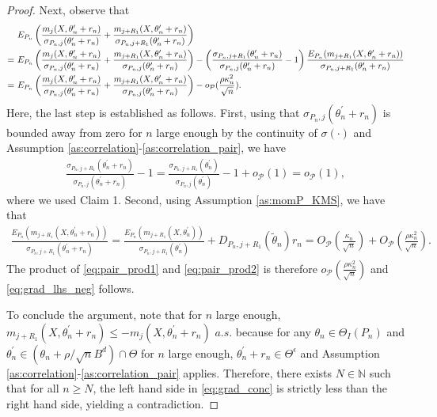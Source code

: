\documentclass[letterpaper,11pt]{article}
\theoremstyle{myplain}
\theoremstyle{mydefinition}
\theoremstyle{myremark}
\newcommand{\N}{\mathbb{N}}
\newcommand{\cP}{\mathcal{P}}
\newcommand{\thetnprime}{(\theta_n +\rho /\sqrt{n} B^d)\cap \Theta}
\numberwithin{equation}{section}
\numberwithin{figure}{section}
\begin{document}
\begin{appendices}
\begin{proof}
Next, observe that
\begin{align}
&~E_{P_n}\left( \frac{m_j(X,\theta^\prime_n+r_n)}{\sigma_{P_n,j}(\theta^\prime_n+r_n)} + \frac{m_{j+R_1}(X,\theta^\prime_n+r_n)}{\sigma_{P_n,j+R_1}(\theta^\prime_n+r_n)}\right) \notag\\
= &~E_{P_n}\left( \frac{m_j(X,\theta^\prime_n+r_n)}{\sigma_{P_n,j}(\theta^\prime_n+r_n)} + \frac{m_{j+R_1}(X,\theta^\prime_n+r_n)}{\sigma_{P_n,j}(\theta^\prime_n+r_n)}\right) - \left(\frac{\sigma_{P_n,j+R_1}(\theta^\prime_n+r_n)}{\sigma_{P_n,j}(\theta^\prime_n+r_n)}-1 \right) \frac{E_{P_n}(m_{j+R_1}(X,\theta^\prime_n+r_n))}{\sigma_{P_n,j+R_1}(\theta^\prime_n+r_n)}\notag\\
= &~E_{P_n}\left( \frac{m_j(X,\theta^\prime_n+r_n)}{\sigma_{P_n,j}(\theta^\prime_n+r_n)} + \frac{m_{j+R_1}(X,\theta^\prime_n+r_n)}{\sigma_{P_n,j}(\theta^\prime_n+r_n)}\right) - o_\cP(\frac{\rho \kappa_n^2}{\sqrt n}).\label{eq:grad_lhs_neg}
\end{align}
Here, the last step is established as follows.
First, using that $\sigma_{P_n,j}(\theta^\prime_n+r_n)$ is bounded away from zero for $n$ large enough by the continuity of $\sigma(\cdot)$ and Assumption \ref{as:correlation}-\ref{as:correlation_pair}, we have
\begin{align}
\frac{\sigma_{P_n,j+R_1}(\theta^\prime_n+r_n)}{\sigma_{P_n,j}(\theta^\prime_n+r_n)}-1=\frac{\sigma_{P_n,j+R_1}(\theta^\prime_n)}{\sigma_{P_n,j}(\theta^\prime_n)}-1 +o_\cP(1)=o_\cP(1),\label{eq:pair_prod1}
\end{align}
where we used Claim 1.
Second, using Assumption \ref{as:momP_KMS}, we have that
\begin{align}
\frac{E_{P_n}(m_{j+R_1}(X,\theta^\prime_n+r_n))}{\sigma_{P_n,j+R_1}(\theta^\prime_n+r_n)} = \frac{E_{P_n}(m_{j+R_1}(X,\theta^\prime_n))}{\sigma_{P_n,j+R_1}(\theta^\prime_n)}+D_{P_n,j+R_1}(\tilde{\theta}_n) r_n = O_\cP(\frac{\kappa_n}{\sqrt n})+O_\cP(\frac{\rho \kappa_n^2}{\sqrt n}).\label{eq:pair_prod2}
\end{align}
The product of \eqref{eq:pair_prod1} and \eqref{eq:pair_prod2} is therefore $o_\cP(\frac{\rho \kappa_n^2}{\sqrt n})$ and \eqref{eq:grad_lhs_neg} follows.

To conclude the argument, note that for $n$ large enough, $m_{j+R_1}(X,\theta^\prime_n+r_n) \le - m_j(X,\theta^\prime_n+r_n)$ $a.s.$ because for any $\theta_n \in \Theta_I(P_n)$ and $\theta^\prime_n \in \thetnprime$ for $n$ large enough, $\theta^\prime_n+r_n \in \Theta^\epsilon$ and Assumption \ref{as:correlation}-\ref{as:correlation_pair} applies. Therefore, there exists $N \in \N$ such that for all $n \ge N$, the left hand side in \eqref{eq:grad_conc} is strictly less than the right hand side, yielding a contradiction.
\end{proof}


\end{appendices}
\end{document}
